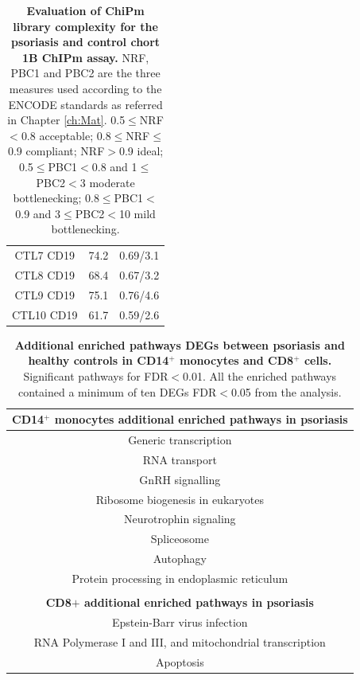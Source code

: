 \begin{table}[htbp]
\begin{tabular}{@{} c c c}
CTL7	CD19  & 74.2	& 0.69/3.1\\
CTL8	CD19  & 68.4  &	0.67/3.2\\
CTL9	CD19  & 75.1  &	0.76/4.6\\
CTL10	CD19  & 61.7  & 0.59/2.6\\
\bottomrule
\end{tabular}
\medskip %
\caption[Evaluation of ChiPm library complexity for the psoriasis and control chort 1B ChIPm assay.]{\textbf{Evaluation of ChiPm library complexity for the psoriasis and control chort 1B ChIPm assay.} NRF, PBC1 and PBC2 are the three measures used according to the ENCODE standards as referred in Chapter \ref{ch:Mat}. 0.5$\leq$NRF$<$0.8 acceptable; 0.8$\leq$NRF$\leq$0.9 compliant; NRF$>$0.9 ideal; 0.5$\leq$PBC1$<$0.8 and 1$\leq$PBC2$<$3 moderate bottlenecking; 0.8$\leq$PBC1$<$0.9 and 3$\leq$PBC2$<$10 mild bottlenecking.}
\label{tab:ChIPm_PS_CTL_library_complexity}
\end{table}
\bigskip %

\begin{table}[htbp]
\centering
\begin{tabular}{@{} c }
\toprule
\textbf{CD14$^+$ monocytes additional enriched pathways in psoriasis} \\
\midrule
\midrule
Generic transcription \\
RNA transport \\
GnRH signalling \\
Ribosome biogenesis in eukaryotes \\
Neurotrophin signaling \\
Spliceosome \\
Autophagy \\
Protein processing in endoplasmic reticulum \\
                        \\
\textbf{CD8$+$ additional enriched pathways in psoriasis} \\
\midrule
\midrule
Epstein-Barr virus infection \\
RNA Polymerase I and III, and mitochondrial transcription\\
Apoptosis \\
\bottomrule
\end{tabular}
\medskip %
\caption[Additional enriched pathways for DEGs between psoriasis and healthy controls in CD14$^+$ monocytes and CD8$^+$ cells.]{\textbf{Additional enriched pathways DEGs between psoriasis and healthy controls in CD14$^+$ monocytes and CD8$^+$ cells.} Significant pathways for FDR$<$0.01. All the enriched pathways contained a minimum of ten DEGs FDR$<$0.05 from the analysis.}
\label{tab:RNAseq_PS_CTL_additional_pathways}
\end{table}



